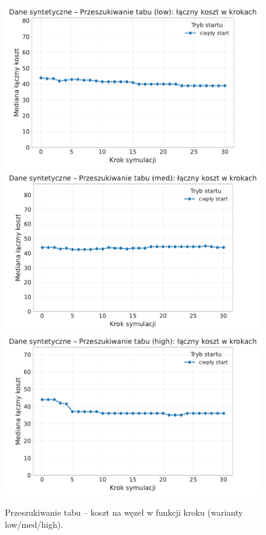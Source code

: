 \begin{figure}[H]
  \centering
  \includegraphics[width=0.62\linewidth]{assets/figures/dynamic/synthetic/synthetic_przeszukiwanie_tabu_cost_over_steps_low.pdf}\\[0.4em]
  \includegraphics[width=0.62\linewidth]{assets/figures/dynamic/synthetic/synthetic_przeszukiwanie_tabu_cost_over_steps_med.pdf}\\[0.4em]
  \includegraphics[width=0.62\linewidth]{assets/figures/dynamic/synthetic/synthetic_przeszukiwanie_tabu_cost_over_steps_high.pdf}
  \caption{Przeszukiwanie tabu -- koszt na węzeł w funkcji kroku (warianty low/med/high).}
  \label{fig:dyn-synth-tabu-cost}
\end{figure}


